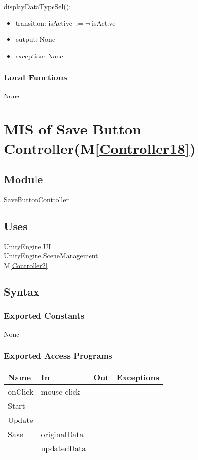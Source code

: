 \documentclass[12pt, titlepage]{article}
\newcommand{\mref}[1]{M\ref{#1}}
\begin{document}
\noindent displayDataTypeSel():
\begin{itemize}
\item transition: isActive $\mathit{:= \neg}$ isActive
\item output: None
\item exception: None
\end{itemize}

\subsubsection{Local Functions}
None


\newpage


\section{MIS of Save Button Controller(\mref{Controller18})}  

\subsection{Module}

SaveButtonController

\subsection{Uses}
UnityEngine.UI\\
UnityEngine.SceneManagement\\
\mref{Controller2}

\subsection{Syntax}
\subsubsection{Exported Constants}
None
\subsubsection{Exported Access Programs}

\begin{center}
\begin{tabular}{| l | l | l | p{5cm}|}
\hline
\textbf{Name} & \textbf{In} & \textbf{Out} & \textbf{Exceptions} \\
\hline
onClick & mouse click &  &  \\
\hline
Start &&&\\
\hline
Update &&&\\
\hline
Save &originalData &&\\
\hline
&updatedData&&\\
\hline
\end{tabular}
\end{center}
\end{document}
